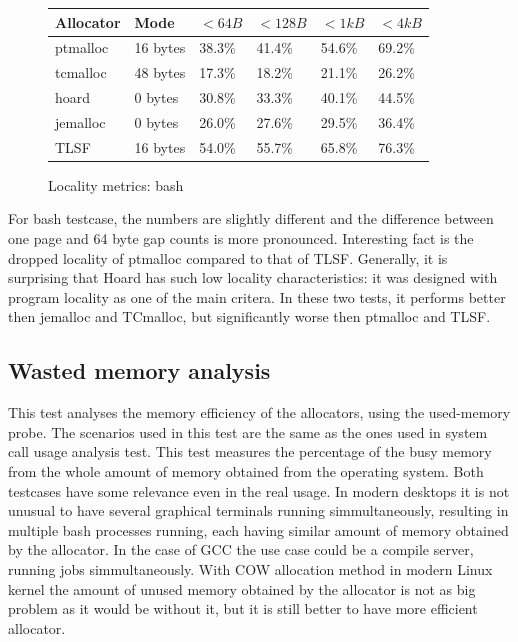 \begin{figure}[h]
\begin{center}
\begin{tabular}{|l|l|l|l|l|l|}
\hline
Allocator & Mode & $ <64B $ & $ <128B $ & $ <1kB $ & $ <4kB $ \\ \hline \hline
ptmalloc & 16 bytes & 38.3\% & 41.4\% & 54.6\% & 69.2\% \\ \hline
tcmalloc & 48 bytes & 17.3\% & 18.2\% & 21.1\% & 26.2\% \\ \hline
hoard & 0 bytes & 30.8\% & 33.3\% & 40.1\% & 44.5\% \\ \hline
jemalloc & 0 bytes & 26.0\% & 27.6\% & 29.5\% & 36.4\% \\ \hline
TLSF & 16 bytes & 54.0\% & 55.7\% & 65.8\% & 76.3\% \\ \hline
\end{tabular}
\caption{Locality metrics: bash}
\label{loc:bash}
\end{center}
\end{figure}

For bash testcase, the numbers are slightly different and the difference between one page and 64 byte gap counts is more pronounced. Interesting fact is the dropped locality of ptmalloc compared to that of TLSF. Generally, it is surprising that Hoard has such low locality characteristics: it was designed with program locality as one of the main critera. In these two tests, it performs better then jemalloc and TCmalloc, but significantly worse then ptmalloc and TLSF.

\subsection{Wasted memory analysis}

This test analyses the memory efficiency of the allocators, using the used-memory probe. The scenarios used in this test are the same as the ones used in system call usage analysis test. This test measures the percentage of the busy memory from the whole amount of memory obtained from the operating system. Both testcases have some relevance even in the real usage. In modern desktops it is not unusual to have several graphical terminals running simmultaneously, resulting in multiple bash processes running, each having similar amount of memory obtained by the allocator. In the case of GCC the use case could be a compile server, running jobs simmultaneously. With COW allocation method in modern Linux kernel the amount of unused memory obtained by the allocator is not as big problem as it would be without it, but it is still better to have more efficient allocator.

